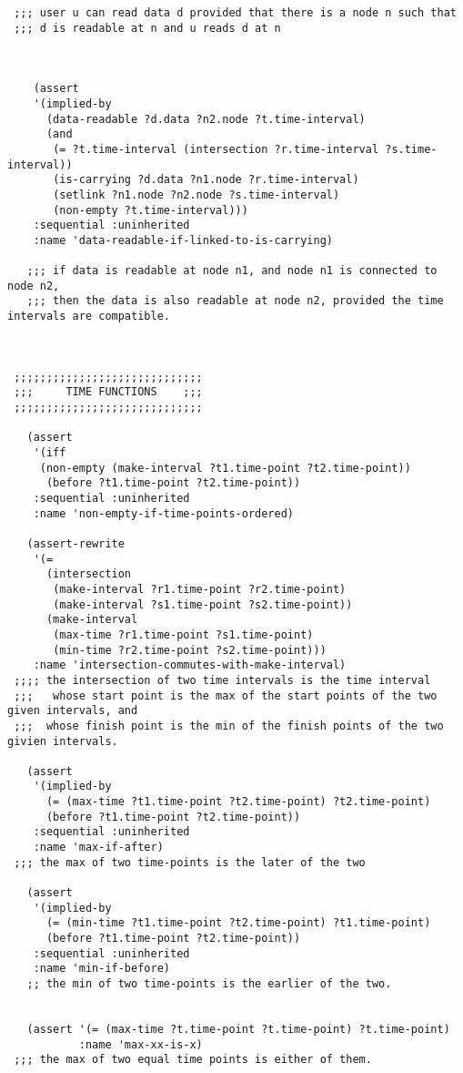 \begin{lstlisting}
 ;;; user u can read data d provided that there is a node n such that
 ;;; d is readable at n and u reads d at n



    (assert
    '(implied-by
      (data-readable ?d.data ?n2.node ?t.time-interval)
      (and
       (= ?t.time-interval (intersection ?r.time-interval ?s.time-interval))
       (is-carrying ?d.data ?n1.node ?r.time-interval)
       (setlink ?n1.node ?n2.node ?s.time-interval)
       (non-empty ?t.time-interval)))
    :sequential :uninherited
    :name 'data-readable-if-linked-to-is-carrying)

   ;;; if data is readable at node n1, and node n1 is connected to node n2,
   ;;; then the data is also readable at node n2, provided the time intervals are compatible.



 ;;;;;;;;;;;;;;;;;;;;;;;;;;;;;
 ;;;     TIME FUNCTIONS    ;;;
 ;;;;;;;;;;;;;;;;;;;;;;;;;;;;;

   (assert
    '(iff
     (non-empty (make-interval ?t1.time-point ?t2.time-point))
      (before ?t1.time-point ?t2.time-point))
    :sequential :uninherited
    :name 'non-empty-if-time-points-ordered)

   (assert-rewrite
    '(=
      (intersection
       (make-interval ?r1.time-point ?r2.time-point)
       (make-interval ?s1.time-point ?s2.time-point))
      (make-interval
       (max-time ?r1.time-point ?s1.time-point)
       (min-time ?r2.time-point ?s2.time-point)))
    :name 'intersection-commutes-with-make-interval)
 ;;;; the intersection of two time intervals is the time interval
 ;;;   whose start point is the max of the start points of the two given intervals, and
 ;;;  whose finish point is the min of the finish points of the two givien intervals.

   (assert
    '(implied-by
      (= (max-time ?t1.time-point ?t2.time-point) ?t2.time-point)
      (before ?t1.time-point ?t2.time-point))
    :sequential :uninherited
    :name 'max-if-after)
 ;;; the max of two time-points is the later of the two

   (assert
    '(implied-by
      (= (min-time ?t1.time-point ?t2.time-point) ?t1.time-point)
      (before ?t1.time-point ?t2.time-point))
    :sequential :uninherited
    :name 'min-if-before)
   ;; the min of two time-points is the earlier of the two.


   (assert '(= (max-time ?t.time-point ?t.time-point) ?t.time-point)
           :name 'max-xx-is-x)
 ;;; the max of two equal time points is either of them.


\end{lstlisting}
